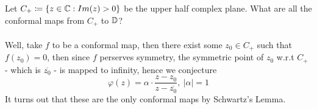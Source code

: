 \begin{example}
    Let $C_+ \coloneqq \{z \in \mathbb{C} : Im(z) > 0\}$ be the upper half complex plane. What are all the conformal maps from $C_+$ to $\mathbb{D}$?\\\\
    Well, take $f$ to be a conformal map, then there exist some $z_0 \in C_+$ such that $f(z_0) = 0$, then since $f$ perserves symmetry, the symmetric point of $z_0$ w.r.t $C_+$ - which is $\overline{z_0}$ - is mapped to infinity, hence we conjecture
    \[\varphi(z) = \alpha \cdot \frac{z - z_0}{z - \overline{z_0}},\ |\alpha| = 1\]
    It turns out that these are the only conformal maps by Schwartz's Lemma.
\end{example}